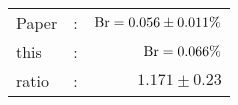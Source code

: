       \begin{tabular}{lcr}
          Paper &:& $\mathrm{Br}  = 0.056\pm 0.011\%$ \\
          this      &:& $\mathrm{Br}  = 0.066\%$ \\
		  ratio   &:& $1.171\pm 0.23$ \\
      \end{tabular}

